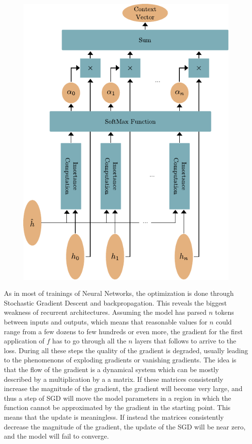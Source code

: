 \documentclass[]{marticle}
\begin{document}
\begin{figure}[] 
\begin{center}
\includegraphics{context_with_attention.pdf}
\caption{} 
\end{center}
\end{figure}

As in most of trainings of Neural Networks, the optimization is done through Stochastic Gradient
Descent and backpropagation. This reveals the biggest weakness of recurrent architectures. Assuming
the model has parsed $n$ tokens between inputs and outputs, which means that reasonable values for
$n$ could range from a few dozens to few hundreds or even more, the gradient for the first
application of $f$ has to go through all the $n$ layers that follows to arrive to the loss. During
all these steps the quality of the gradient is degraded, usually leading to the phenomenons of
exploding gradients or vanishing gradients. The idea is that the flow of the gradient is a dynamical
system which can be mostly described by a multiplication by a a matrix. If these matrices
consistently increase the magnitude of the gradient, the gradient will become very large, and thus a
step of SGD will move the model parameters in a region in which the function cannot be approximated
by the gradient in the starting point. This means that the update is meaningless. If instead the
matrices consistently decrease the magnitude of the gradient, the update of the SGD will be near
zero, and the model will fail to converge.
\end{document}
